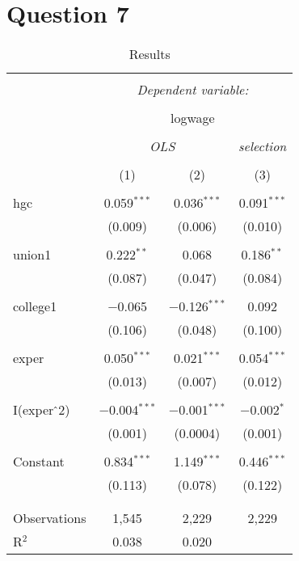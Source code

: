 \documentclass{article}
\begin{document}
\section{Question 7}
\begin{table}[!htbp] \centering 
  \caption{Results} 
  \label{} 
\begin{tabular}{@{\extracolsep{5pt}}lccc} 
\\[-1.8ex]\hline 
\hline \\[-1.8ex] 
 & \multicolumn{3}{c}{\textit{Dependent variable:}} \\ 
\cline{2-4} 
\\[-1.8ex] & \multicolumn{3}{c}{logwage} \\ 
\\[-1.8ex] & \multicolumn{2}{c}{\textit{OLS}} & \textit{selection} \\ 
\\[-1.8ex] & (1) & (2) & (3)\\ 
\hline \\[-1.8ex] 
 hgc & 0.059$^{***}$ & 0.036$^{***}$ & 0.091$^{***}$ \\ 
  & (0.009) & (0.006) & (0.010) \\ 
  & & & \\ 
 union1 & 0.222$^{**}$ & 0.068 & 0.186$^{**}$ \\ 
  & (0.087) & (0.047) & (0.084) \\ 
  & & & \\ 
 college1 & $-$0.065 & $-$0.126$^{***}$ & 0.092 \\ 
  & (0.106) & (0.048) & (0.100) \\ 
  & & & \\ 
 exper & 0.050$^{***}$ & 0.021$^{***}$ & 0.054$^{***}$ \\ 
  & (0.013) & (0.007) & (0.012) \\ 
  & & & \\ 
 I(exper$\hat{\mkern6mu}$2) & $-$0.004$^{***}$ & $-$0.001$^{***}$ & $-$0.002$^{*}$ \\ 
  & (0.001) & (0.0004) & (0.001) \\ 
  & & & \\ 
 Constant & 0.834$^{***}$ & 1.149$^{***}$ & 0.446$^{***}$ \\ 
  & (0.113) & (0.078) & (0.122) \\ 
  & & & \\ 
\hline \\[-1.8ex] 
Observations & 1,545 & 2,229 & 2,229 \\ 
R$^{2}$ & 0.038 & 0.020 &  \\ 

\end{tabular}
\end{table}
\end{document}
